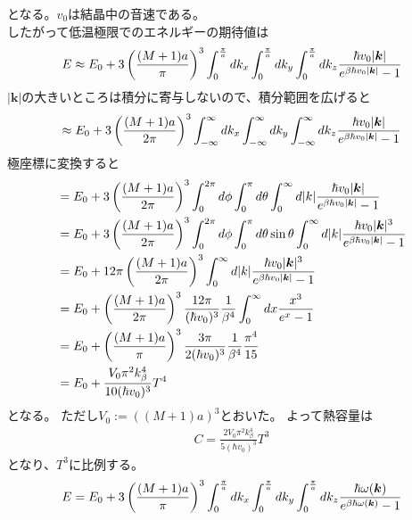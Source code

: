 \documentclass{jsarticle}  %
\numberwithin{equation}{section} %
\numberwithin{figure}{section}
\begin{document}
    となる。$v_0$は結晶中の音速である。\\
    したがって低温極限でのエネルギーの期待値は
    \begin{align}
        E \approx E_0 + 3\left( \frac{(M+1)a}{\pi} \right)^3 \int_0^{\frac{\pi}{a}} dk_x \int_0^{\frac{\pi}{a}} dk_y \int_0^{\frac{\pi}{a}} dk_z \frac{\hbar  v_0 |\bm{k}| }{ e^{\beta \hbar  v_0 |\bm{k}|} - 1} \notag 
    \end{align}
    $|\bm{k}|$の大きいところは積分に寄与しないので、積分範囲を広げると
    \begin{align}
        \approx E_0 + 3\left( \frac{(M+1)a}{2\pi} \right)^3 \int_{-\infty}^{\infty} dk_x \int_{-\infty}^{\infty} dk_y \int_{-\infty}^{\infty} dk_z \frac{\hbar  v_0 |\bm{k}| }{ e^{\beta \hbar  v_0 |\bm{k}|} - 1} \notag 
    \end{align}
    極座標に変換すると
    \begin{align}
        &= E_0 + 3\left( \frac{(M+1)a}{2\pi} \right)^3 \int_0^{2\pi} d\phi \int_0^{\pi} d\theta \int_0^{\infty} d|k| \frac{\hbar  v_0 |\bm{k}| }{ e^{\beta \hbar  v_0 |\bm{k}|} - 1} \notag \\
        &= E_0 + 3\left( \frac{(M+1)a}{2\pi} \right)^3 \int_0^{2\pi} d\phi \int_0^{\pi} d\theta \sin \theta \int_0^{\infty} d|k| \frac{\hbar  v_0 |\bm{k}|^3 }{ e^{\beta \hbar  v_0 |\bm{k}|} - 1} \notag \\
        &=E_0 + 12\pi \left( \frac{(M+1)a}{2\pi} \right)^3 \int_0^{\infty} d|k| \frac{\hbar  v_0 |\bm{k}|^3 }{ e^{\beta \hbar  v_0 |\bm{k}|} - 1} \notag \\
        &=E_0 + \left( \frac{(M+1)a}{2\pi} \right)^3  \frac{12\pi}{(\hbar v_0)^3} \frac{1}{\beta^4} \int_0^{\infty} dx \frac{x^3 }{ e^{x} - 1} \notag \\
        &=E_0 + \left( \frac{(M+1)a}{\pi} \right)^3  \frac{3\pi}{2(\hbar v_0)^3} \frac{1}{\beta^4} \frac{\pi^4}{15} \notag \\
        &=E_0 + \frac{V_0 \pi^2 k_\beta^4}{10(\hbar v_0)^3} T^4  
    \end{align}
    となる。
    ただし$V_0 := \left( {(M+1)a} \right)^3 $とおいた。
    よって熱容量は
    \begin{align}
        C = \frac{2V_0 \pi^2 k_\beta^4}{5(\hbar v_0)^3} T^3  
    \end{align}
    となり、$T^3$に比例する。\\
    \begin{align}
        E =  E_0 + 3\left( \frac{(M+1)a}{\pi} \right)^3 \int_0^{\frac{\pi}{a}} dk_x \int_0^{\frac{\pi}{a}} dk_y \int_0^{\frac{\pi}{a}} dk_z \frac{\hbar \omega (\bm{k})}{ e^{\beta \hbar \omega (\bm{k})} - 1} \notag 
    \end{align}
\end{document}
